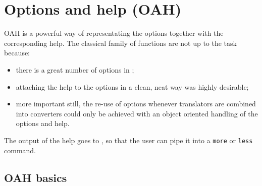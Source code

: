 



\chapter{Options and help (OAH)}

OAH is a powerful way of representating the options together with the corresponding help. The classical  family of functions are not up to the task because:
\begin{itemize}
\item there is a great number of options in \mf;
\item attaching the help to the options in a clean, neat way was highly desirable;
\item more important still, the re-use of options whenever translators are combined into converters could only be achieved with an object oriented handling of the options and help.
\end{itemize}

The output of the help  goes to \standardOutput, so that the user can pipe it into a {\tt more} or {\tt less} command.


\section{OAH basics}

